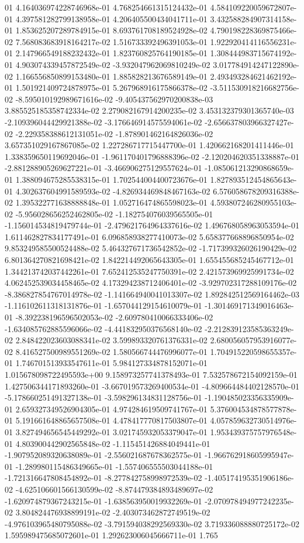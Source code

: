 01	4.164036974228746968e-01	4.768254661315124432e-01	4.584109220059672807e-01	4.397581282799138958e-01	4.206405500434041711e-01	3.432588284907314158e-01	1.853625207289784915e-01	8.693761708189524928e-02	4.790198228369875466e-02	7.568083683918164217e-02	1.516733392496391053e-01	1.922920414116556231e-01	2.147966549188232432e-01	1.823760825764190185e-01	1.308444983715674192e-01	4.903074339457872549e-02	-3.932047962069810249e-02	3.017784914247122890e-02	1.166556850899153480e-01	1.885828213676589149e-01	2.493493284621462192e-01	1.501921409724878975e-01	5.267968916175866378e-02	-3.511530918216682756e-02	-8.595010192989671616e-02	-9.405437562970200838e-03	3.885525185358742334e-02	2.279082167914200235e-02	3.453132379301365740e-03	-2.109396044429921388e-02	-3.176646914575594061e-02	-2.656637803966327427e-02	-2.229358388612131051e-02	-1.878901462164826036e-02	3.657351029167867085e-02	1.227286717715447700e-01	1.420662168201411446e-01	1.338359650119692046e-01	-1.961170401796888396e-02	-2.120204620351338887e-01	-2.881288905269627221e-01	-3.466906275129557624e-01	-1.085061213290868659e-01	1.388094675285538315e-01	1.702544004400723676e-01	1.827893512454865643e-01	4.302637604991589593e-02	-4.826934469848467163e-02	6.576058678209316388e-02	1.395322771638888848e-01	1.052716474865598023e-01	4.593807246280955103e-02	-5.956028656252462805e-02	-1.182754076039565505e-01	-1.156014534819479744e-01	-2.479621764964337616e-02	1.496768058963053594e-01	1.611462827834177491e-01	6.096858938277410073e-02	5.658377668896850954e-02	9.853249585500524488e-02	5.464327671736542852e-02	-1.717399326026190429e-02	6.801364270821698421e-02	1.842214492065643305e-01	1.655455685245467712e-01	1.344213742037442261e-01	7.652412535247750391e-02	2.421573969925991734e-02	4.062452539034458465e-02	4.173294238712406401e-02	-3.929702317288109176e-02	-8.386827854767014978e-02	-1.141664940041013307e-02	1.892842512569164462e-03	-1.116102611318131876e-01	-1.657044129154610079e-01	-1.301469171349016463e-01	-8.392238196596502053e-02	-2.609780410066333406e-02	-1.634085762885596066e-02	-4.441832950376568140e-02	-2.212839123585363249e-02	2.848422023603088341e-02	3.599893320761376331e-02	2.680056057953916077e-02	8.416527500989551269e-02	1.580566744476996077e-01	1.704915220598655357e-01	1.746701513933547611e-01	5.984127334878152071e-01	1.015678098722495593e+00	9.158973257741378493e-01	7.532578672154092159e-01	1.427506344171893260e-01	-3.667019573269400534e-01	-4.809664484402128570e-01	-5.178660251491327138e-01	-3.598296134831128756e-01	-1.190485023356335909e-01	2.659327349526904305e-01	4.974284619509741767e-01	5.376004534878577878e-01	5.191661648865657508e-01	4.478417770817503807e-01	4.057859632730514976e-01	3.827494656545449292e-01	3.021745932053379047e-01	1.953439375757976548e-01	4.803900442902565848e-02	-1.115451426884049441e-01	-1.907952089320638089e-01	-2.556021687678362575e-01	-1.966762918605995947e-01	-1.289980115486349665e-01	-1.557406555503044188e-01	-1.721316647808454892e-01	-8.277842758998972539e-02	-1.405174195351906186e-02	-4.625106601566130599e-02	-8.874479384893489697e-02	-1.620974879367243215e-01	-1.638563950019932269e-01	-2.070978494977242235e-02	3.804824476938899191e-02	-2.403073462872749519e-02	-4.976103965480795088e-02	-3.791594038292569330e-02	3.719336088880725172e-02	1.595989475685072601e-01	1.292623006045666711e-01	1.765